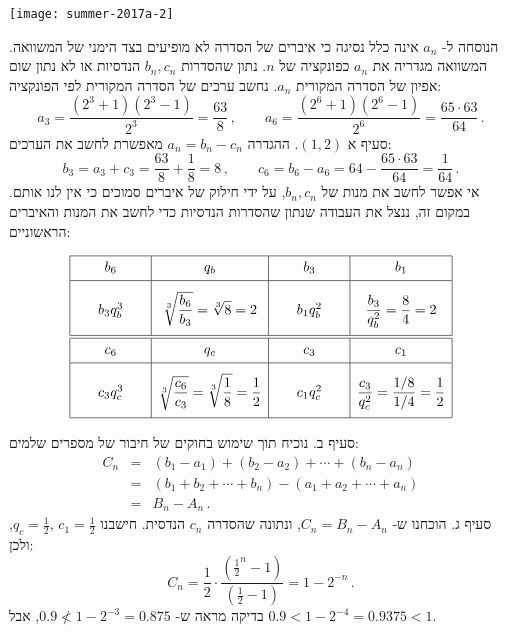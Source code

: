 \begin{center}
\texttt{[image: summer-2017a-2]}
\end{center}
הנוסחה ל-%
$a_n$
אינה כלל נסיגה כי איברים של הסדרה לא מופיעים בצד הימני של המשוואה. המשוואה מגדריה את
$a_n$
כפונקציה של
$n$.
נתון שהסדרות 
$b_n,c_n$
הנדסיות או לא נתון שום אפיון של הסדרה המקורית
$a_n$.
נחשב ערכים של הסדרה המקורית לפי הפונקציה:
\[
a_3=\frac{(2^3+1)(2^3-1)}{2^3}=\frac{63}{8}\,, \quad\quad a_6=\frac{(2^6+1)(2^6-1)}{2^6}= \frac{65\cdot 63}{64}\,.
\]
סעיף א 
$(1,2)$.
ההגדרה
$a_n=b_n-c_n$
מאפשרת לחשב את הערכים:
\[
b_3=a_3+c_3=\frac{63}{8}+\frac{1}{8}=8\,,\quad\quad c_6=b_6-a_6=64-\frac{65\cdot 63}{64}=\frac{1}{64}\,.
\]
אי אפשר לחשב את מנות של
$b_n,c_n$,
על ידי חילוק של איברים סמוכים כי אין לנו אותם. במקום זה, ננצל את העבודה שנתון שהסדרות הנדסיות כדי לחשב את המנות והאיברים הראשוניים:

\[
\begin{array}{|@{\hspace{2em}}c@{\hspace{2em}}|c|@{\hspace{2em}}c@{\hspace{2em}}|c|}
\hline
\rule[-1.5ex]{0pt}{4ex}b_6&q_b&b_3&b_1\\\hline
\rule[-3.5ex]{0pt}{9ex}b_3q_b^3 & \displaystyle\sqrt[3]{\frac{b_6}{b_3}}=\sqrt[3]{8}=2&
b_1 q_b^2 & \displaystyle\frac{b_3}{q_b^2}=\frac{8}{4}=2\\\hline\hline
\rule[-1.5ex]{0pt}{4ex}c_6&q_c&c_3&c_1\\\hline
c_3q_c^3 & \displaystyle\sqrt[3]{\frac{c_6}{c_3}} =\sqrt[3]{\frac{1}{8}} = \frac{1}{2}&
\rule[-3.5ex]{0pt}{9ex}c_1 q_c^2 & \displaystyle\frac{c_3}{q_c^2}=\frac{1/8}{1/4}=\frac{1}{2}\\
\hline
\end{array}
\]

סעיף ב. נוכיח תוך שימוש בחוקים של חיבור של מספרים שלמים:
\begin{eqnarray*}
C_n &=& (b_1-a_1) + (b_2 - a_2) + \cdots + (b_n-a_n)\\
&=&(b_1 + b_2 + \cdots + b_n) - (a_1 + a_2 + \cdots + a_n)\\
&=& B_n - A_n\,.
\end{eqnarray*}
סעיף ג. הוכחנו ש-%
$C_n=B_n-A_n$,
ונתונה שהסדרה 
$c_n$
הנדסית. חישבנו 
$q_c=\frac{1}{2},\,c_1=\frac{1}{2}$,
ולכן:
\[
C_n = \frac{1}{2}\cdot\frac{\displaystyle\left(\frac{1}{2}^n-1\right)}{\displaystyle\left(\frac{1}{2}-1\right)}=1-2^{-n}\,.
\]
בדיקה מראה ש-%
$0.9 \not< 1-2^{-3}=0.875$,
אבל
$0.9 < 1-2^{-4}=0.9375 < 1$.

